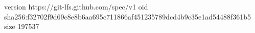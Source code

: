version https://git-lfs.github.com/spec/v1
oid sha256:f32702f9d69c8e8b6aa695c711866af451235789dcd4b9c35e1ad54488f361b5
size 197537
